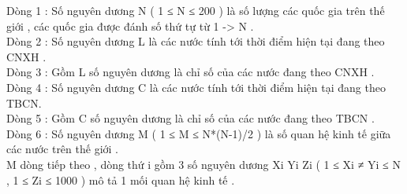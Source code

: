 Dòng 1 : Số nguyên dương N ( 1 ≤ N ≤ 200 ) là số lượng các quốc gia trên thế giới , các quốc gia được đánh số thứ tự từ 1 -> N .   
\\   Dòng 2 : Số nguyên dương L là các nước tính tới thời điểm hiện tại đang theo CNXH .   
\\   Dòng 3 : Gồm L số nguyên dương là chỉ số của các nước đang theo CNXH .   
\\   Dòng 4 : Số nguyên dương C là các nước tính tới thời điểm hiện tại đang theo TBCN.   
\\   Dòng 5 : Gồm C số nguyên dương là chỉ số của các nước đang theo TBCN .   
\\   Dòng 6 : Số nguyên dương M ( 1 ≤ M ≤ N*(N-1)/2 ) là số quan hệ kinh tế giữa các nước trên thế giới .   
\\   M dòng tiếp theo , dòng thứ i gồm 3 số nguyên dương Xi Yi Zi ( 1 ≤ Xi ≠ Yi ≤ N , 1 ≤ Zi ≤ 1000 ) mô tả 1 mối quan hệ kinh tế .